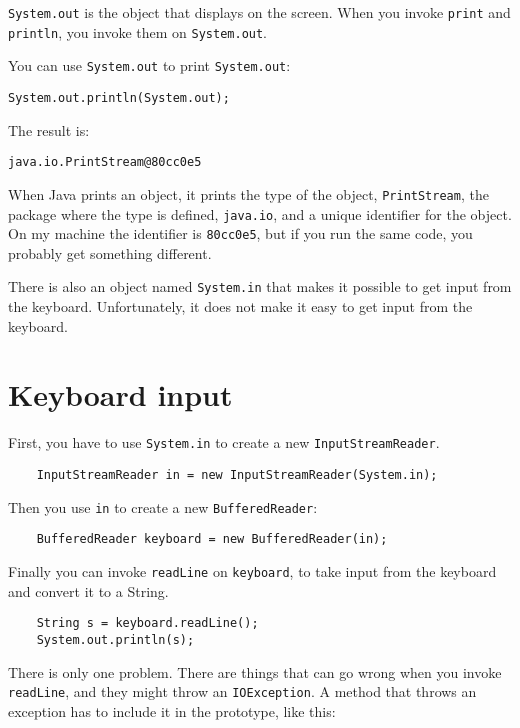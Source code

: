 \documentclass[12pt]{book}
\theoremstyle{definition}
\begin{document}
{\tt System.out} is the object that displays
on the screen.  When you invoke {\tt print} and {\tt println}, you
invoke them on {\tt System.out}.

You can use {\tt System.out} to print {\tt System.out}:

\begin{lstlisting}
System.out.println(System.out);
\end{lstlisting}
%
The result is:

\begin{lstlisting}
java.io.PrintStream@80cc0e5
\end{lstlisting}
%
When Java prints an object, it prints the type
of the object, {\tt PrintStream}, the package
where the type is defined, {\tt java.io}, and a
unique identifier for the object.  On my machine the identifier
is {\tt 80cc0e5}, but if you run the same code, you
probably get something different.

There is also an object named {\tt System.in} that makes it
possible to get input from the keyboard.  Unfortunately,
it does not make it easy to get input from the keyboard.


\section{Keyboard input}
\label{keyboard}

First, you have to use {\tt System.in} to create a new
{\tt InputStreamReader}.

\begin{lstlisting}
    InputStreamReader in = new InputStreamReader(System.in);
\end{lstlisting}
%
Then you use {\tt in} to create a new {\tt BufferedReader}:

\begin{lstlisting}
    BufferedReader keyboard = new BufferedReader(in);
\end{lstlisting}
%
Finally you can invoke {\tt readLine} on {\tt keyboard}, 
to take input from the keyboard and convert it to a
String.

\begin{lstlisting}
    String s = keyboard.readLine();
    System.out.println(s);
\end{lstlisting}
%
There is only one problem.  There are things that can go wrong when
you invoke {\tt readLine}, and they might throw an {\tt IOException}.  A
method that throws an exception has to include it in the
prototype, like this:
\end{document}
